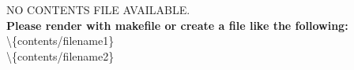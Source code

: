 \makeglossaries



\nocite{*}
	\begin{spacing}{1}
		
	\end{spacing}
	\newpage
	
	\renewcommand{\thepage}{\Roman{page}}
	\setcounter{page}{1}
	
	
	\newpage

	
	\newpage

	\pagestyle{plain}

	\begin{spacing}{1.1}
		\setcounter{tocdepth}{3}
		\tableofcontents
	\end{spacing}
	\newpage

	\renewcommand{\thepage}{\arabic{page}}
	\setcounter{page}{1}

	    {} 
	    {NO CONTENTS FILE AVAILABLE.\\  
	    \textbf{Please render with makefile or create a file like the following:}\\ 
	    \textbackslash\{contents/filename1\}\\ 
	    \textbackslash\{contents/filename2\}\\ 
	    } 

	\clearpage

	\cleardoublepage
	 \label{listoffig}
	\listoffigures

	\cleardoublepage
	 \label{listoftab}
	\listoftables

	\cleardoublepage
	 \label{listoflist}
	\lstlistoflistings

	\cleardoublepage
	 \label{listoflit}
	{}
	

	\printglossary[type=\acronymtype]

	\printglossary[style=altlist,title=Glossary]



